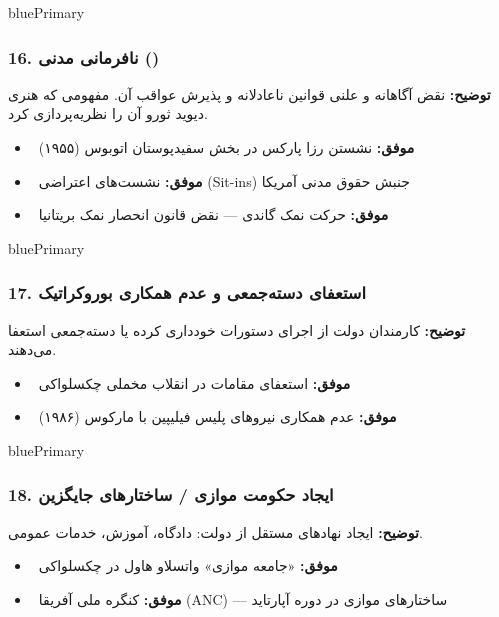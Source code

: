 \documentclass[a4paper,12pt]{article}
\newcommand{\success}[1]{\textcolor{greenPrimary}{\faCheckCircle\ \textbf{موفق:}} #1}
\newcommand{\methodnum}[1]{\textcolor{purpleLight}{\textbf{#1.}}}
\begin{document}
\begin{methodcard}{bluePrimary}
\subsubsection{\methodnum{16} نافرمانی مدنی ()}
\textbf{توضیح:} نقض آگاهانه و علنی قوانین ناعادلانه و پذیرش عواقب آن. مفهومی که هنری دیوید ثورو آن را نظریه‌پردازی کرد.

\begin{itemize}[label=\textcolor{greenPrimary}{\faCheckCircle}]
  \item \success{نشستن رزا پارکس در بخش سفیدپوستان اتوبوس (۱۹۵۵)}
  \item \success{نشست‌های اعتراضی (Sit-ins) جنبش حقوق مدنی آمریکا}
  \item \success{حرکت نمک گاندی — نقض قانون انحصار نمک بریتانیا}
\end{itemize}
\end{methodcard}

\begin{methodcard}{bluePrimary}
\subsubsection{\methodnum{17} استعفای دسته‌جمعی و عدم همکاری بوروکراتیک}
\textbf{توضیح:} کارمندان دولت از اجرای دستورات خودداری کرده یا دسته‌جمعی استعفا می‌دهند.

\begin{itemize}[label=\textcolor{greenPrimary}{\faCheckCircle}]
  \item \success{استعفای مقامات در انقلاب مخملی چکسلواکی}
  \item \success{عدم همکاری نیروهای پلیس فیلیپین با مارکوس (۱۹۸۶)}
\end{itemize}
\end{methodcard}

\begin{methodcard}{bluePrimary}
\subsubsection{\methodnum{18} ایجاد حکومت موازی / ساختارهای جایگزین}
\textbf{توضیح:} ایجاد نهادهای مستقل از دولت: دادگاه، آموزش، خدمات عمومی.

\begin{itemize}[label=\textcolor{greenPrimary}{\faCheckCircle}]
  \item \success{«جامعه موازی» واتسلاو هاول در چکسلواکی}
  \item \success{کنگره ملی آفریقا (ANC) — ساختارهای موازی در دوره آپارتاید}
\end{itemize}
\end{methodcard}
\end{document}
